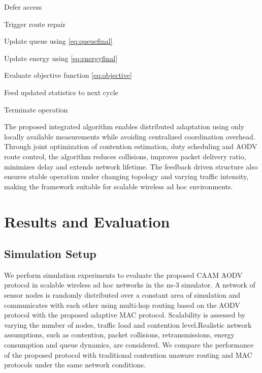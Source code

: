\documentclass[a4paper,fleqn,final,1p]{cas-dc}
\numberwithin{equation}{section}
\begin{document}
\begin{algorithm}[H]
\begin{algorithmic}[1]
\EndIf

\Else

\State Defer access

\EndIf


\State Trigger route repair

\EndIf

\State Update queue using
\ref{eq:queuefinal}

\State Update energy using
\ref{eq:energyfinal}

\State Evaluate objective function
\ref{eq:objective}

\State Feed updated statistics to next cycle

\EndWhile

\State Terminate operation

\end{algorithmic}
\end{algorithm}

The proposed integrated algorithm enables distributed adaptation using only locally available measurements while avoiding centralized coordination overhead. Through joint optimization of contention estimation, duty scheduling and AODV route control, the algorithm reduces collisions, improves packet delivery ratio, minimizes delay and extends network lifetime. The feedback driven structure also ensures stable operation under changing topology and varying traffic intensity, making the framework suitable for scalable wireless ad hoc environments.

\section{Results and Evaluation}

\subsection{Simulation Setup}

We perform simulation experiments to evaluate the proposed CAAM AODV protocol in scalable wireless ad hoc networks in the ns-3 simulator. A network of sensor nodes is randomly distributed over a constant area of simulation and communicates with each other using multi-hop routing based on the AODV protocol with the proposed adaptive MAC protocol. Scalability is assessed by varying the number of nodes, traffic load and contention level.Realistic network assumptions, such as contention, packet collisions, retransmissions, energy consumption and queue dynamics, are considered. We compare the performance of the proposed protocol with traditional contention unaware routing and MAC protocols under the same network conditions.
\end{document}
